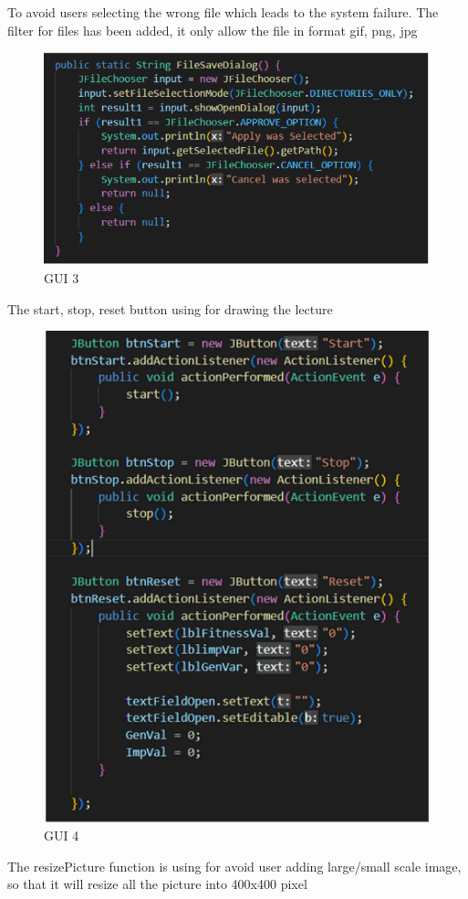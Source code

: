 To avoid users selecting the wrong file which leads to the system failure. The filter for files has been added, it only allow the file in format gif, png, jpg 
\begin{figure}
\centering
\includegraphics[width=4.5in]{images/gui3.png}
\caption{GUI 3}
\end{figure}

\newpage

The start, stop, reset button using for drawing the lecture

\begin{figure}
\centering
\includegraphics[width=4.5in]{images/gui4.png}

\caption{GUI 4}
\end{figure}
\newpage
The resizePicture function is using for avoid user adding large/small scale image, so that it will resize all the picture into 400x400 pixel 

